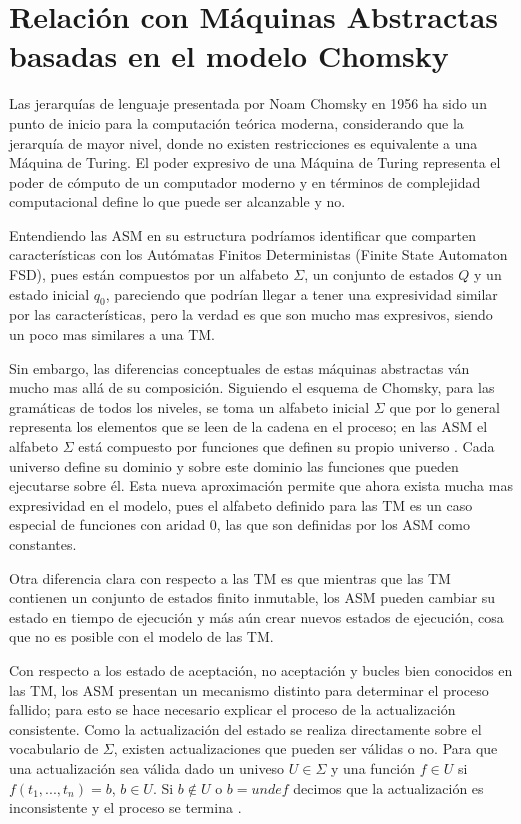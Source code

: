 \documentclass{article}
\begin{document}
\section{Relación con Máquinas Abstractas basadas en el modelo Chomsky}
Las jerarquías de lenguaje presentada por Noam Chomsky en 1956 \cite{ChomskyTHREELANGUAGE} ha sido un punto de inicio para la computación teórica moderna, considerando que la jerarquía de mayor nivel, donde no existen restricciones es equivalente a una Máquina de Turing. El poder expresivo de una Máquina de Turing representa el poder de cómputo de un computador moderno y en términos de complejidad computacional define lo que puede ser alcanzable y no.

Entendiendo las ASM en su estructura podríamos identificar que comparten características con los Autómatas Finitos Deterministas (Finite State Automaton FSD), pues están compuestos por un alfabeto $ \Sigma $, un conjunto de estados $ Q $ y un estado inicial $q_0$, pareciendo que podrían llegar a tener una expresividad similar por las características, pero la verdad es que son mucho mas expresivos, siendo un poco mas similares a una TM.

Sin embargo, las diferencias conceptuales de estas máquinas abstractas ván mucho mas allá de su composición. Siguiendo el esquema de Chomsky, para las gramáticas de todos los niveles, se toma un alfabeto inicial $ \Sigma $ que por lo general representa los elementos que se leen de la cadena en el proceso; en las ASM el alfabeto $ \Sigma $ está compuesto por funciones que definen su propio universo \cite{Gurevich1993TheLanguage}. Cada universo define su dominio y sobre este dominio las funciones que pueden ejecutarse sobre él. Esta nueva aproximación permite que ahora exista mucha mas expresividad en el modelo, pues el alfabeto definido para las TM es un caso especial de funciones con aridad 0, las que son definidas por los ASM como constantes.

Otra diferencia clara con respecto a las TM es que mientras que las TM contienen un conjunto de estados finito inmutable, los ASM pueden cambiar su estado en tiempo de ejecución y más aún crear nuevos estados de ejecución, cosa que no es posible con el modelo de las TM.

Con respecto a los estado de aceptación, no aceptación y bucles bien conocidos en las TM, los ASM presentan un mecanismo distinto para determinar el proceso fallido; para esto se hace necesario explicar el proceso de la actualización consistente. Como la actualización del estado se realiza directamente sobre el vocabulario de $\Sigma$, existen actualizaciones que pueden ser válidas o no. Para que una actualización sea válida dado un univeso $U \in \Sigma$ y una función $f \in U $ si $f(t_1,...,t_n)=b$, $b \in U$. Si $b \not\in U$ o $b=undef$ decimos que la actualización es inconsistente y el proceso se termina \cite{Stark2001AbstractMachines}.
\end{document}
